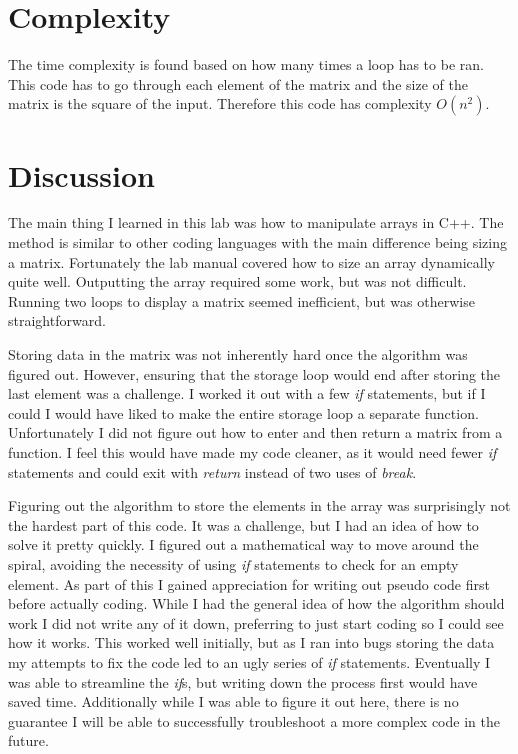 \documentclass{article}
\begin{document}
\section{Complexity}
The time complexity is found based on how many times a loop has to be ran. This code has to go through each element of the matrix and the size of the matrix is the square of the input. Therefore this code has complexity $O(n^2)$.

\section{Discussion}
The main thing I learned in this lab was how to manipulate arrays in C++. The method is similar to other coding languages with the main difference being sizing a matrix. Fortunately the lab manual covered how to size an array dynamically quite well. Outputting the array required some work, but was not difficult. Running two loops to display a matrix seemed inefficient, but was otherwise straightforward.

Storing data in the matrix was not inherently hard once the algorithm was figured out. However, ensuring that the storage loop would end after storing the last element was a challenge. I worked it out with a few \textit{if} statements, but if I could I would have liked to make the entire storage loop a separate function. Unfortunately I did not figure out how to enter and then return a matrix from a function. I feel this would have made my code cleaner, as it would need fewer \textit{if} statements and could exit with \textit{return} instead of two uses of \textit{break}.

Figuring out the algorithm to store the elements in the array was surprisingly not the hardest part of this code. It was a challenge, but I had an idea of how to solve it pretty quickly. I figured out a mathematical way to move around the spiral, avoiding the necessity of using \textit{if} statements to check for an empty element. As part of this I gained appreciation for writing out pseudo code first before actually coding. While I had the general idea of how the algorithm should work I did not write any of it down, preferring to just start coding so I could see how it works. This worked well initially, but as I ran into bugs storing the data my attempts to fix the code led to an ugly series of \textit{if} statements. Eventually I was able to streamline the \textit{if}s, but writing down the process first would have saved time. Additionally while I was able to figure it out here, there is no guarantee I will be able to successfully troubleshoot a more complex code in the future.
\end{document}
